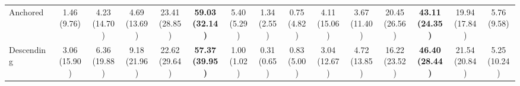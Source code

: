 {\begin{tabular}{l|ccccccc|ccccccc}
Anchored & \makecell{1.46 \\ (9.76)} & \makecell{4.23 \\ (14.70)} & \makecell{4.69 \\ (13.69)} & \makecell{23.41 \\ (28.85)} & \cellcolor[HTML]{C8E6C9}\bfseries \makecell{59.03 \\ (32.14)} & \makecell{5.40 \\ (5.29)} & \makecell{1.34 \\ (2.55)} & \makecell{0.75 \\ (4.82)} & \makecell{4.11 \\ (15.06)} & \makecell{3.67 \\ (11.40)} & \makecell{20.45 \\ (26.56)} & \cellcolor[HTML]{C8E6C9}\bfseries \makecell{43.11 \\ (24.35)} & \makecell{19.94 \\ (17.84)} & \makecell{5.76 \\ (9.58)} \\
Descending & \makecell{3.06 \\ (15.90)} & \makecell{6.36 \\ (19.88)} & \makecell{9.18 \\ (21.96)} & \makecell{22.62 \\ (29.64)} & \cellcolor[HTML]{C8E6C9}\bfseries \makecell{57.37 \\ (39.95)} & \makecell{1.00 \\ (1.02)} & \makecell{0.31 \\ (0.65)} & \makecell{0.83 \\ (5.00)} & \makecell{3.04 \\ (12.67)} & \makecell{4.72 \\ (13.85)} & \makecell{16.22 \\ (23.52)} & \cellcolor[HTML]{C8E6C9}\bfseries \makecell{46.40 \\ (28.44)} & \makecell{21.54 \\ (20.84)} & \makecell{5.25 \\ (10.24)} \\
\bottomrule
\end{tabular}}
